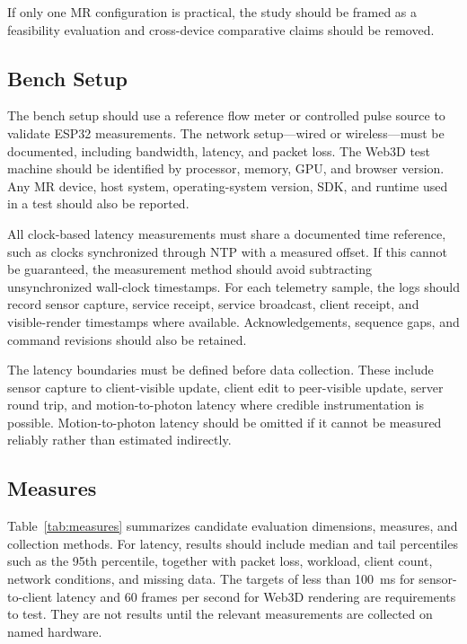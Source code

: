 \documentclass[conference]{IEEEtran}
\begin{document}
If only one MR configuration is practical, the study should be framed as a feasibility evaluation and cross-device comparative claims should be removed.

\subsection{Bench Setup}
The bench setup should use a reference flow meter or controlled pulse source to validate ESP32 measurements. The network setup---wired or wireless---must be documented, including bandwidth, latency, and packet loss. The Web3D test machine should be identified by processor, memory, GPU, and browser version. Any MR device, host system, operating-system version, SDK, and runtime used in a test should also be reported.

All clock-based latency measurements must share a documented time reference, such as clocks synchronized through NTP with a measured offset. If this cannot be guaranteed, the measurement method should avoid subtracting unsynchronized wall-clock timestamps. For each telemetry sample, the logs should record sensor capture, service receipt, service broadcast, client receipt, and visible-render timestamps where available. Acknowledgements, sequence gaps, and command revisions should also be retained.

The latency boundaries must be defined before data collection. These include sensor capture to client-visible update, client edit to peer-visible update, server round trip, and motion-to-photon latency where credible instrumentation is possible. Motion-to-photon latency should be omitted if it cannot be measured reliably rather than estimated indirectly.

\subsection{Measures}
Table~\ref{tab:measures} summarizes candidate evaluation dimensions, measures, and collection methods. For latency, results should include median and tail percentiles such as the 95th percentile, together with packet loss, workload, client count, network conditions, and missing data. The targets of less than 100~ms for sensor-to-client latency and 60 frames per second for Web3D rendering are requirements to test. They are not results until the relevant measurements are collected on named hardware.
\end{document}
